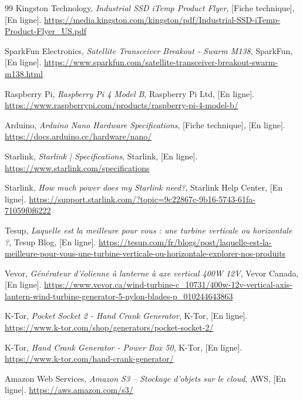 \begin{thebibliographyUL}{99}
   Kingston Technology, \emph{Industrial SSD iTemp Product Flyer}, [Fiche technique], [En ligne]. \url{https://media.kingston.com/kingston/pdf/Industrial-SSD-iTemp-Product-Flyer_US.pdf}

   SparkFun Electronics, \emph{Satellite Transceiver Breakout - Swarm M138}, SparkFun, [En ligne]. \url{https://www.sparkfun.com/satellite-transceiver-breakout-swarm-m138.html}

   Raspberry Pi, \emph{Raspberry Pi 4 Model B}, Raspberry Pi Ltd, [En ligne]. \url{https://www.raspberrypi.com/products/raspberry-pi-4-model-b/}

   Arduino, \emph{Arduino Nano Hardware Specifications}, [Fiche technique], [En ligne]. \url{https://docs.arduino.cc/hardware/nano/}

   Starlink, \emph{Starlink | Specifications}, Starlink, [En ligne]. \url{https://www.starlink.com/specifications}

   Starlink, \emph{How much power does my Starlink need?}, Starlink Help Center, [En ligne]. \url{https://support.starlink.com/?topic=9c22867c-9b16-5743-61fa-71059f0f6222}

   Tesup, \emph{Laquelle est la meilleure pour vous : une turbine verticale ou horizontale ?}, Tesup Blog, [En ligne]. \url{https://tesup.com/fr/blogs/post/laquelle-est-la-meilleure-pour-vous-une-turbine-verticale-ou-horizontale-explorer-nos-produits}

   Vevor, \emph{Générateur d'éolienne à lanterne à axe vertical 400W 12V}, Vevor Canada, [En ligne]. \url{https://www.vevor.ca/wind-turbine-c_10731/400w-12v-vertical-axis-lantern-wind-turbine-generator-5-nylon-blades-p_010244643863}

   K-Tor, \emph{Pocket Socket 2 - Hand Crank Generator}, K-Tor, [En ligne]. \url{https://www.k-tor.com/shop/generators/pocket-socket-2/}

   K-Tor, \emph{Hand Crank Generator - Power Box 50}, K-Tor, [En ligne]. \url{https://www.k-tor.com/hand-crank-generator/}

   Amazon Web Services, \emph{Amazon S3 – Stockage d'objets sur le cloud}, AWS, [En ligne]. \url{https://aws.amazon.com/s3/}

\end{thebibliographyUL}
